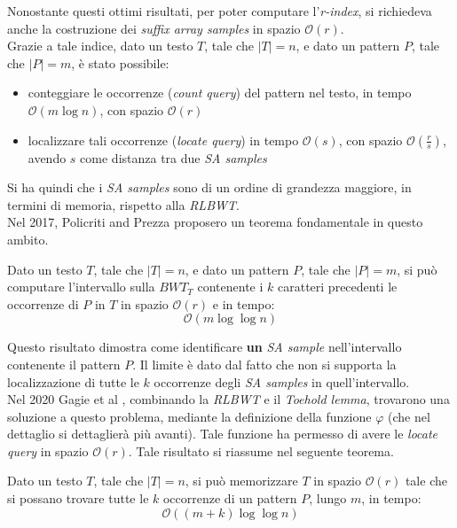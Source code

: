 Nonostante questi ottimi risultati, per poter computare l'\textit{r-index}, si
richiedeva anche la costruzione dei \textit{suffix array samples} in
spazio $\mathcal{O}(r)$. \\
Grazie a tale indice, dato un testo $T$, tale che
$|T|=n$, e dato un pattern $P$, tale che $|P|=m$, è stato possibile: 
\begin{itemize}
  \item conteggiare le occorrenze (\textit{count query}) del pattern nel testo,
  in tempo $\mathcal{O}(m\log n)$, con spazio $\mathcal{O}(r)$  
  \item localizzare tali occorrenze (\textit{locate query}) in tempo
  $\mathcal{O}(s)$, con spazio $\mathcal{O}\left(\frac{r}{s}\right)$, avendo $s$
  come distanza tra due \textit{SA samples}
\end{itemize}
Si ha quindi che i \textit{SA samples} sono di un ordine di grandezza maggiore,
in termini di memoria, rispetto alla \textit{RLBWT}.\\
Nel 2017, Policriti and Prezza \cite{policriti} proposero un teorema
fondamentale in questo ambito.
\begin{teorema}
  Dato un testo $T$, tale che $|T|=n$, e dato un pattern $P$, tale
  che $|P|=m$, si può computare l'intervallo sulla $BWT_T$ contenente i $k$
  caratteri precedenti le occorrenze di $P$ in $T$ in spazio $\mathcal{O}(r)$ e
  in tempo: 
  \begin{equation}
    \label{eq:rlbwt3}
    \mathcal{O}(m\log\log n)
  \end{equation}
\end{teorema}
Questo risultato dimostra come identificare \textbf{un} \textit{SA sample}
nell'intervallo 
contenente il pattern $P$. Il limite è dato dal fatto che non si supporta la
localizzazione di tutte le $k$ occorrenze degli \textit{SA samples} in
quell'intervallo.\\
Nel 2020 Gagie et al \cite{gagie2020}, combinando la \textit{RLBWT} e il
\textit{Toehold lemma}, trovarono una soluzione a questo problema, 
mediante la definizione della funzione $\varphi$ (che nel dettaglio si
dettaglierà più avanti). Tale funzione ha permesso di avere le \textit{locate
  query} in spazio $\mathcal{O}(r)$.
Tale risultato si riassume nel seguente teorema.
\begin{teorema}
  Dato un testo $T$, tale che $|T|=n$, si può memorizzare $T$ in spazio
  $\mathcal{O}(r)$ tale che si possano trovare tutte le $k$ occorrenze di un
  pattern $P$, lungo $m$, in tempo:
  \begin{equation}
    \label{eq:rlbwt4}
    \mathcal{O}((m+k)\log\log n)
  \end{equation}
\end{teorema}
